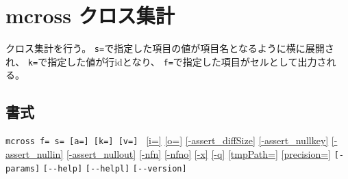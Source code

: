 
%

\section{mcross クロス集計\label{sect:mcross}}
クロス集計を行う。
\verb|s=|で指定した項目の値が項目名となるように横に展開され、
\verb|k=|で指定した値が行idとなり、
\verb|f=|で指定した項目がセルとして出力される。

\subsection*{書式}
\verb|mcross f= s= [a=] [k=] [v=] |
\hyperref[sect:option_i]{[i=]}
\hyperref[sect:option_o]{[o=]}
\hyperref[sect:option_assert_diffSize]{[-assert\_diffSize]}
\hyperref[sect:option_assert_nullkey]{[-assert\_nullkey]}
\hyperref[sect:option_assert_nullin]{[-assert\_nullin]}
\hyperref[sect:option_assert_nullout]{[-assert\_nullout]}
\hyperref[sect:option_nfn]{[-nfn]} 
\hyperref[sect:option_nfno]{[-nfno]}  
\hyperref[sect:option_x]{[-x]}
\hyperref[sect:option_q]{[-q]}
\hyperref[sect:option_option_tmppath]{[tmpPath=]}
\hyperref[sect:option_precision]{[precision=]}
\verb|[-params]|
\verb|[--help]|
\verb|[--helpl]|
\verb|[--version]|\\

